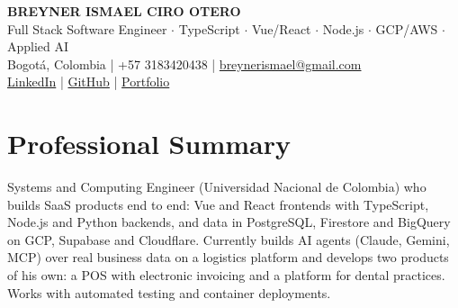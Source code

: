 \documentclass[11pt,a4paper]{article}
\begin{document}
\begin{center}
    {\huge \textbf{BREYNER ISMAEL CIRO OTERO}} \\ \vspace{0.15cm}
    {\large Full Stack Software Engineer $\cdot$ TypeScript $\cdot$ Vue/React $\cdot$ Node.js $\cdot$ GCP/AWS $\cdot$ Applied AI} \\ \vspace{0.15cm}
    Bogotá, Colombia | +57 3183420438 | \href{mailto:breynerismael@gmail.com}{breynerismael@gmail.com} \\ \vspace{0.1cm}
    \href{https://www.linkedin.com/in/breyner-ciro-38011330b/}{LinkedIn} | \href{https://github.com/breynerciro}{GitHub} | \href{https://breynerciro.github.io/}{Portfolio}
\end{center}

\vspace{0.2cm}

\section*{Professional Summary}
Systems and Computing Engineer (Universidad Nacional de Colombia) who builds SaaS products end to end: Vue and React frontends with TypeScript, Node.js and Python backends, and data in PostgreSQL, Firestore and BigQuery on GCP, Supabase and Cloudflare. Currently builds AI agents (Claude, Gemini, MCP) over real business data on a logistics platform and develops two products of his own: a POS with electronic invoicing and a platform for dental practices. Works with automated testing and container deployments.
\end{document}
